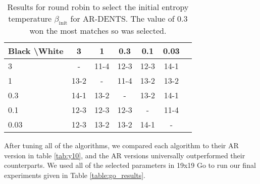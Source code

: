     \begin{table*}[]
    \centering
        \begin{tabular}{l|cccccc}
            \textbf{Black \textbackslash White}     & 3  & 1   & 0.3   & 0.1    & 0.03    \\ 
            \hline
                                    3            & - & 11-4 & 12-3 & 12-3 & 14-1  		\\
                                    1            & 13-2 & - & 11-4 & 13-2 & 13-2  		\\
                                    0.3            & 14-1 & 13-2 & - & 13-2 & 14-1  		\\
                                    0.1            & 12-3 & 12-3 & 12-3 & - & 11-4  		\\
                                    0.03            & 12-3 & 13-2 & 13-2 & 14-1 &  - 		\\
        \end{tabular}
        \caption{Results for round robin to select the initial entropy temperature $\beta_{\text{init}}$ for AR-DENTS. The value of 0.3 won the most matches so was selected. \label{tab:x070}}
    \end{table*}
    
    
    
    
    
    
    
    After tuning all of the algorithms, we compared each algorithm to their AR version in table \ref{tab:y10}, and the AR versions universally outperformed their counterparts. We used all of the selected parameters in 19x19 Go to run our final experiments given in Table \ref{table:go_results}.
    
    
    
